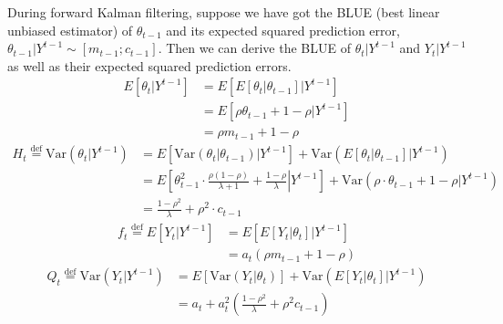 \documentclass[12pt]{article}
\begin{document}
\begin{enumerate}[(a)]
During forward Kalman filtering, suppose we have got the BLUE (best linear unbiased estimator) of $\theta_{t-1}$ and its expected squared prediction error, $\left. \theta_{t-1} \right\vert Y^{t-1} \sim [m_{t-1}; c_{t-1}]$. Then we can derive the BLUE of $\left. \theta_{t} \right\vert Y^{t-1}$ and $\left. Y_{t} \right\vert Y^{t-1}$ as well as their expected squared prediction errors.
\begin{align}
	 E\left[\left. \theta_t \right\vert Y^{t-1}\right]&=E\left[ \left.E[\left. \theta_{t} \right\vert \theta_{t-1}]\right\vert Y^{t-1} \right] \nonumber \\ 
	&= E\left[\left. \rho\theta_{t-1}+1-\rho\right\vert Y^{t-1} \right] \nonumber\\ 
	&=\rho m_{t-1} + 1 - \rho 	
\end{align}
\begin{align}
	H_t \stackrel{\text{def}}{=} \text{Var}\left(\left. \theta_t\right\vert Y^{t-1} \right) &= E\left[\left. \text{Var}\left(\left.\theta_t\right\vert \theta_{t-1} \right) \right\vert Y^{t-1} \right] + \text{Var}\left( \left.   E\left[\left. \theta_{t} \right\vert \theta_{t-1} \right]\right\vert Y^{t-1} \right) \nonumber \\
	&= E\left[ \left. \theta_{t-1}^2\cdot \frac{\rho(1-\rho)}{\lambda + 1} + \frac{1-\rho}{\lambda} \right\vert Y^{t-1} \right] +\text{Var}\left( \left. \rho \cdot \theta_{t-1}+1-\rho \right\vert Y^{t-1} \right) \nonumber \\
	&= \frac{1-\rho^2}{\lambda} + \rho^2 \cdot c_{t-1}
\end{align}
\begin{align}
	f_{t} \stackrel{\text{def}}{=} E\left[\left. Y_{t} \right\vert Y^{t-1} \right] &= E\left[ \left. E\left[ \left. Y_{t} \right\vert \theta_{t} \right] \right\vert Y^{t-1} \right] \nonumber \\
	&= a_{t}(\rho m_{t-1}+1-\rho)
\end{align}
\begin{align}
	Q_{t} \stackrel{\text{def}}{=} \text{Var}\left(\left.Y_{t}\right\vert Y^{t-1} \right)&= E\left[\text{Var}\left( \left.Y_{t}\right\vert \theta_t \right) \right] + \text{Var}\left(\left. E\left[ \left.Y_{t}\right\vert\theta_t \right] \right\vert Y^{t-1} \right)\nonumber \\
	& = a_{t} + a_{t}^2 \left( \frac{1-\rho^2}{\lambda}+\rho^2 c_{t-1} \right)
\end{align}



\end{enumerate}
\end{document}
